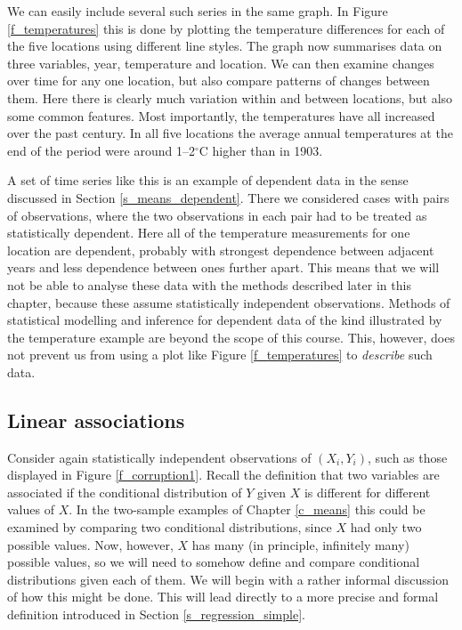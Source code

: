 We can easily include several such series in the
same graph. In Figure \ref{f_temperatures} this is done by plotting the
temperature differences for each of the five locations using different
line styles. The graph now summarises data on three variables, year,
temperature and location. We can then examine changes over time for any
one location, but also compare patterns of changes between them. Here
there is clearly much variation within and between locations, but also
some common features. Most importantly, the
temperatures have all increased over the past century. In all five
locations the average annual temperatures at the end of the period were
around 1--2$^{\circ}$C higher than in 1903.

A set of time series like this is an example of dependent data in the
sense discussed in Section \ref{s_means_dependent}. There we considered
cases with pairs of observations, where the two observations in each
pair had to be treated as statistically dependent. Here all of the
temperature measurements for one location are dependent, probably
with strongest dependence between adjacent years and less dependence
between ones further apart. This means that we will not be able to
analyse these data with the methods described later in this chapter,
because these assume statistically independent observations. Methods of
statistical modelling and inference for dependent data of the kind
illustrated by the temperature example are beyond the scope of this
course. This, however, does not prevent us from using a plot like Figure
\ref{f_temperatures} to \emph{describe} such data.

\subsection{Linear associations}
\label{ss_regression_descr_assoc}

Consider again statistically independent observations of $(X_{i},
Y_{i})$, such as those displayed in Figure \ref{f_corruption1}. Recall
the definition that two variables are
associated if the conditional distribution of $Y$ given $X$ is different
for different values of $X$. In the two-sample
examples of Chapter \ref{c_means}
this could be examined by comparing two conditional distributions, since
$X$ had only two possible values. Now, however, $X$ has many (in
principle, infinitely many) possible values, so we will need to somehow
define and compare conditional distributions given each of them. We
will begin with a rather informal discussion of how this might be done.
This will lead directly to a more precise and formal definition
introduced in Section \ref{s_regression_simple}.



